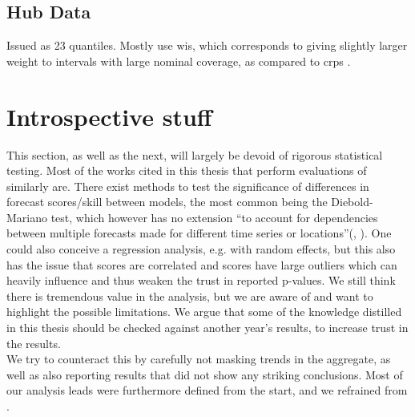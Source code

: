 \subsection{Hub Data}
Issued as 23 quantiles. Mostly use \ac{wis}, which corresponds to giving slightly larger weight to intervals with large nominal coverage, as compared to \ac{crps} \citep{bracher_evaluating_2021}.
\section{Introspective stuff}
This section, as well as the next, will largely be devoid of rigorous statistical testing. Most of the works cited in this thesis that perform evaluations of similarly are. There exist methods to test the significance of differences in forecast scores/skill between models, the most common being the Diebold-Mariano test, which however has no extension ``to account for dependencies between multiple forecasts made for different time series or locations''(\cite{bracher_evaluating_2021}, \cite{diebold_comparing_1995}). One could also conceive a regression analysis, e.g. with random effects, but this also has the issue that scores are correlated and scores have large outliers which can heavily influence and thus weaken the trust in reported p-values. We still think there is tremendous value in the analysis, but we are aware of and want to highlight the possible limitations. We argue that some of the knowledge distilled in this thesis should be checked against another year's results, to increase trust in the results.\\ 
We try to counteract this by carefully not masking trends in the aggregate, as well as also reporting results that did not show any striking conclusions. Most of our analysis leads were furthermore defined from the start, and we refrained from .\\
